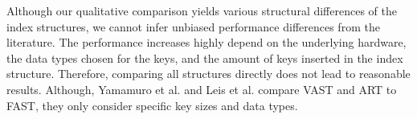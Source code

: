 \documentclass[runningheads,a4paper]{llncs}
\begin{document}
Although our qualitative comparison yields various structural differences of the index structures, we cannot infer unbiased performance differences from the literature. The performance increases highly depend on the underlying hardware, the data types chosen for the keys, and the amount of keys inserted in the index structure. Therefore, comparing all structures directly does not lead to reasonable results. Although, Yamamuro et al. and Leis et al. compare VAST \cite{yamamuro2012vast} and ART \cite{leis2013adaptive} to FAST, they only consider specific key sizes and data types. 




\end{document}
